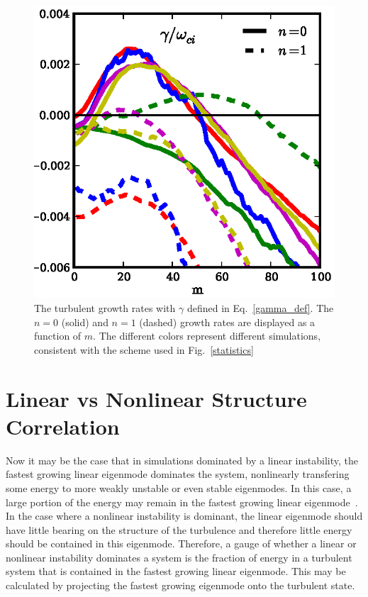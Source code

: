 \documentclass[showpacs,preprintnumbers,amsmath,amssymb,superscriptaddress,aip]{revtex4-1}
\begin{document}
\begin{figure}[!htbp]
\includegraphics[]{lin_vs_nl_gamma}
\hfil
\caption{ The turbulent growth rates with $\gamma$ defined in Eq.~\ref{gamma_def}. The $n=0$ (solid) and $n = 1$ (dashed) 
growth rates are displayed as a function of $m$. The different colors represent different simulations, consistent with the scheme used in Fig.~\ref{statistics}}
\label{nl_vs_lin_gamma}
\end{figure}



\section{Linear vs Nonlinear Structure Correlation}
\label{Sec_lin_vs_nl}

Now it may be the case that in simulations dominated by a linear instability, the fastest growing linear
eigenmode dominates the system, nonlinearly transfering some energy to more weakly unstable or even stable eigenmodes. In this case, a large portion of the energy may remain in the fastest
growing linear eigenmode~\cite{hatch2011}. In the case where a nonlinear instability is dominant, the linear eigenmode should have little bearing on the structure of the turbulence and therefore little
energy should be contained in this eigenmode. Therefore, a gauge of whether a linear or nonlinear instability dominates a system is the fraction of energy in a turbulent system
that is contained in the fastest growing linear eigenmode. This may be calculated by projecting the fastest growing eigenmode onto the turbulent state.
\end{document}
